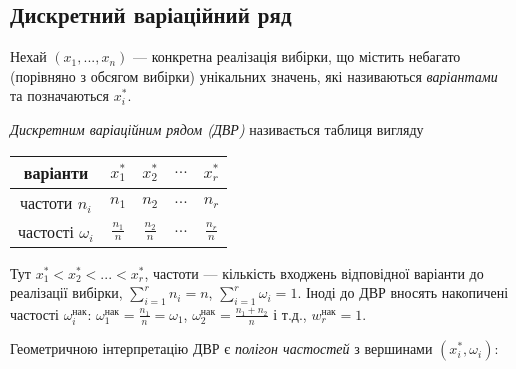 \subsection{Дискретний варіаційний ряд}
Нехай $\left(x_1, ... ,x_n\right)$ --- конкретна реалізація вибірки, що містить небагато (порівняно з обсягом вибірки) унікальних значень,
які називаються \emph{варіантами} та позначаються $x_i^*$.
\begin{definition}
    \emph{Дискретним варіаційним рядом (ДВР)} називається таблиця вигляду
    \begin{center}
    \begin{tabular}{|c|c|c|c|c|}
        \hline
        варіанти & $x_1^*$ & $x_2^*$ & $...$ & $x_r^*$ \\
        \hline
        частоти $n_i$ & $n_1$ & $n_2$ & $...$ & $n_r$ \\
        \hline
        частості $\omega_i $& $\frac{n_1}{n}$ & $\frac{n_2}{n}$ & $...$ & $\frac{n_r}{n}$ \\
        \hline
    \end{tabular}
    \end{center}
    Тут $x_1^* < x_2^* < ... < x_r^*$, частоти --- кількість входжень відповідної варіанти до реалізації вибірки, $\sum\limits_{i=1}^r n_i = n$, $\sum\limits_{i=1}^r \omega_i = 1$.
    Іноді до ДВР вносять накопичені частості $\omega_i^{\text{нак}}$: $\omega_1^{\text{нак}} = \frac{n_1}{n} = \omega_1$, $\omega_2^{\text{нак}} = \frac{n_1+n_2}{n}$ і т.д., $w_r^{\text{нак}} = 1$.
\end{definition}
Геометричною інтерпретацію ДВР є \emph{полігон частостей} з вершинами $\left( x_i^*, \omega_i\right)$:

